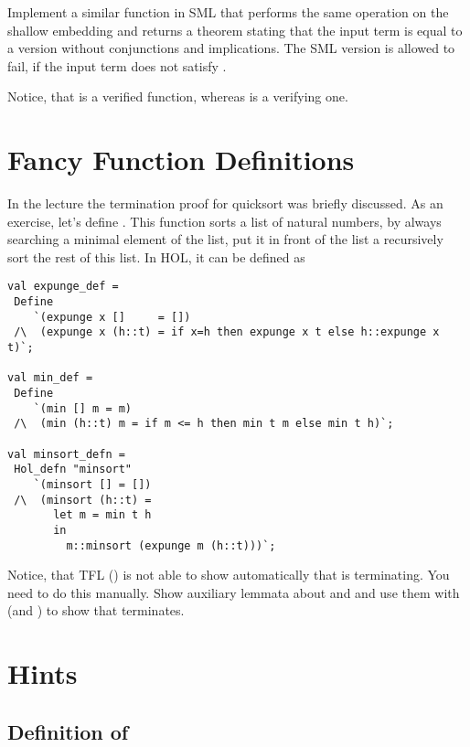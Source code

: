 \documentclass[a4paper,10pt,oneside]{scrartcl}
\begin{document}
Implement a similar function  in SML that performs the same operation on the shallow embedding and returns a theorem stating that the input term is equal to a version without conjunctions and implications. The SML version is allowed to fail, if the input term does not satisfy .

Notice, that  is a verified function, whereas
 is a verifying one.


\section{Fancy Function Definitions}

In the lecture the termination proof for quicksort was briefly discussed.
As an exercise, let's define . This function  sorts
a list of natural numbers, by always searching a minimal element of the list,
put it in front of the list a recursively sort the rest of this list. In HOL, 
it can be defined as

\begin{verbatim}
val expunge_def = 
 Define
    `(expunge x []     = [])
 /\  (expunge x (h::t) = if x=h then expunge x t else h::expunge x t)`;

val min_def = 
 Define
    `(min [] m = m) 
 /\  (min (h::t) m = if m <= h then min t m else min t h)`;

val minsort_defn = 
 Hol_defn "minsort"
    `(minsort [] = []) 
 /\  (minsort (h::t) =
       let m = min t h
       in 
         m::minsort (expunge m (h::t)))`;
\end{verbatim}

Notice, that TFL (\ie {}) is not able to show automatically
that  is terminating. You need to do this manually. Show
auxiliary lemmata about  and  and use them with
 (and ) to show that 
terminates.

\clearpage
\section{Hints}

\subsection{Definition of }
\end{document}
